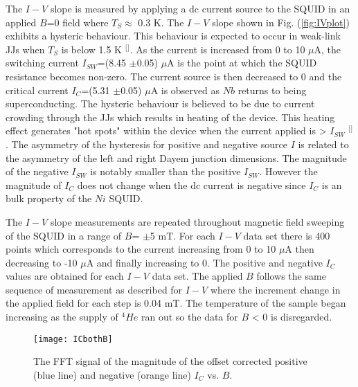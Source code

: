 The $I-V$ slope is measured by applying a dc current source to the SQUID in an applied $B$=0 field where $T_S\approx$ 0.3 K. The $I-V$ slope shown in Fig. (\ref{fig:IVplot}) exhibits a hysteric behaviour. This behaviour is expected to occur in weak-link JJs when $T_S$ is below 1.5 K $^[$\citep{Hao2015FabricationJunctions}$^]$. As the current is increased from 0 to 10 $\mu$A, the switching current $I_{SW}$=(8.45 $\pm$0.05) $\mu$A is the point at which the SQUID resistance becomes non-zero. The current source is then decreased to 0 and the critical current $I_C$=(5.31 $\pm$0.05) $\mu$A is observed as $Nb$ returns to being superconducting. The hysteric behaviour is believed to be due to current crowding through the JJs which results in heating of the device. This heating effect generates "hot spots" within the device when the current applied is > $I_{SW}$ $^[$\citep{Podd2007Micro-SQUIDsJunctions}$^]$. The asymmetry of the hysteresis for positive and negative source $I$ is related to the asymmetry of the left and right Dayem junction dimensions. The magnitude of the negative $I_{SW}$ is notably smaller than the positive $I_{SW}$. However the magnitude of $I_C$ does not change when the dc current is negative since $I_C$ is an bulk property of the $Ni$ SQUID.

The $I-V$ slope measurements are repeated throughout magnetic field sweeping of the SQUID in a range of $B$= $\pm$5 mT. For each $I-V$ data set there is 400 points which corresponds to the current increasing from 0 to 10 $\mu$A then decreasing to -10 $\mu$A and finally increasing to 0. The positive and negative $I_C$ values are obtained for each $I-V$ data set. The applied $B$ follows the same sequence of measurement as described for $I-V$ where the increment change in the applied field for each step is 0.04 mT. The temperature of the sample began increasing as the supply of ${}^4He$ ran out so the data for $B$ < 0 is disregarded.

\begin{figure}[b]
\centering
\texttt{[image: ICbothB]}
\caption{\label{fig:ICbothB}The FFT signal of the magnitude of the offset corrected positive (blue line) and negative (orange line) $I_C$ vs. $B$.}
\end{figure}

